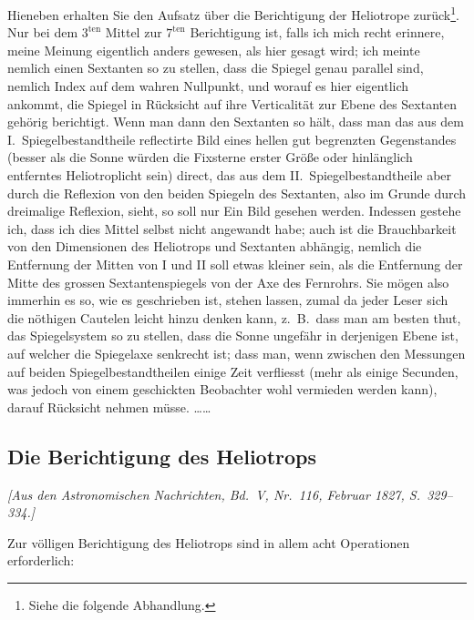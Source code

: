 \documentclass[12pt,a4paper]{article}
\theoremstyle{plain}
\theoremstyle{definition}
\theoremstyle{remark}
\begin{document}
Hieneben erhalten Sie den Aufsatz \"uber die Berichtigung der Heliotrope zur\"uck\footnote{Siehe die folgende Abhandlung.}. Nur bei dem $3^{\text{ten}}$ Mittel zur $7^{\text{ten}}$ Berichtigung ist, falls ich mich recht erinnere, meine Meinung eigentlich anders gewesen, als hier gesagt wird; ich meinte nemlich einen Sextanten so zu stellen, dass die Spiegel genau parallel sind, nemlich Index auf dem wahren Nullpunkt, und worauf es hier eigentlich ankommt, die Spiegel in R\"ucksicht auf ihre Verticalit\"at zur Ebene des Sextanten geh\"orig berichtigt. Wenn man dann den Sextanten so h\"alt, dass man das aus dem I.\ Spiegelbestandtheile reflectirte Bild eines hellen gut begrenzten Gegenstandes (besser als die Sonne w\"urden die Fixsterne erster Gr\"o\ss e oder hinl\"anglich entferntes Heliotroplicht sein) direct, das aus dem II.\ Spiegelbestandtheile aber durch die Reflexion von den beiden Spiegeln des Sextanten, also im Grunde durch dreimalige Reflexion, sieht, so soll nur Ein Bild gesehen werden. Indessen gestehe ich, dass ich dies Mittel selbst nicht angewandt habe; auch ist die Brauchbarkeit von den Dimensionen des Heliotrops und Sextanten abh\"angig, nemlich die Entfernung der Mitten von I und II soll etwas kleiner sein, als die Entfernung der Mitte des grossen Sextantenspiegels von der Axe des Fernrohrs. Sie m\"ogen also immerhin es so, wie es geschrieben ist, stehen lassen, zumal da jeder Leser sich die n\"othigen Cautelen leicht hinzu denken kann, z.~B.\ dass man am besten thut, das Spiegelsystem so zu stellen, dass die Sonne ungef\"ahr in derjenigen Ebene ist, auf welcher die Spiegelaxe senkrecht ist; dass man, wenn zwischen den Messungen auf beiden Spiegelbestandtheilen einige Zeit verfliesst (mehr als einige Secunden, was jedoch von einem geschickten Beobachter wohl vermieden werden kann), darauf R\"ucksicht nehmen m\"usse. \ldots\ldots

\vspace{1em}

\subsection*{Die Berichtigung des Heliotrops}

\noindent
\textit{[Aus den Astronomischen Nachrichten, Bd.~V, Nr.~116, Februar 1827, S.~329--334.]}

\medskip

Zur v\"olligen Berichtigung des Heliotrops sind in allem acht Operationen erforderlich:
\end{document}
